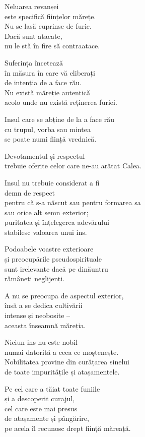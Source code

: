 Neluarea revanșei\\
este specifică ființelor mărețe.\\
Nu se lasă cuprinse de furie.\\
Dacă sunt atacate,\\
nu le stă în fire să contraatace.


Suferința încetează\\
în măsura în care vă eliberați\\
de intenția de a face rău.\\
Nu există măreție autentică\\
acolo unde nu există reținerea furiei.


Insul care se abține de la a face rău\\
cu trupul, vorba sau mintea\\
se poate numi ființă vrednică.


Devotamentul și respectul\\
trebuie oferite celor care ne-au arătat Calea.


Insul nu trebuie considerat a fi\\
demn de respect\\
pentru că s-a născut sau pentru formarea sa\\
sau orice alt semn exterior;\\
puritatea și înțelegerea adevărului\\
stabilesc valoarea unui ins.


Podoabele voastre exterioare\\
și preocupările pseudospirituale\\
sunt irelevante dacă pe dinăuntru\\
rămâneți neglijenți.


A nu se preocupa de aspectul exterior,\\
însă a se dedica cultivării\\
intense și neobosite –\\
aceasta înseamnă măreția.

Niciun ins nu este nobil\\
numai datorită a ceea ce moștenește.\\
Nobilitatea provine din curățarea sinelui\\
de toate impuritățile și atașamentele.

Pe cel care a tăiat toate funiile\\
și a descoperit curajul,\\
cel care este mai presus\\
de atașamente și pângărire,\\
pe acela îl recunosc drept ființă măreață.


